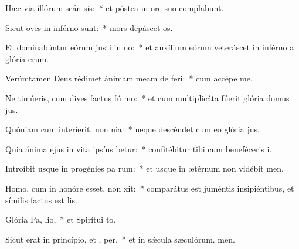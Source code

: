 \item Hæc via illórum scán sis:~* et póstea in ore suo complabunt.
\item Sicut oves in inférno  sunt:~* mors depáscet os.
\item Et dominabúntur eórum justi in no:~* et auxílium eórum veteráscet in inférno a glória erum.
\item Verúmtamen Deus rédimet ánimam meam de  feri:~* cum accépe me.
\item Ne timúeris, cum dives factus fú mo:~* et cum multiplicáta fúerit glória domus jus.
\item Quóniam cum interíerit, non  nia:~* neque descéndet cum eo glória jus.
\item Quia ánima ejus in vita ipsíus betur:~* confitébitur tibi cum beneféceris i.
\item Introíbit usque in progénies pa rum:~* et usque in ætérnum non vidébit men.
\item Homo, cum in honóre esset, non xit:~* comparátus est juméntis insipiéntibus, et símilis factus est lis.
\item Glória Pa,  lio,~* et Spirítui to.
\item Sicut erat in princípio, et ,  per,~* et in sǽcula sæculórum. men.
